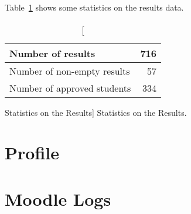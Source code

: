 Table~\ref{tab:results_stats} shows some statistics on the results data.

\begin{table}[h!]
    \centering

    \begin{tabular}{| l | r |}
        \hline
        Number of results           & 716 \\ \hline
        Number of non-empty results & 57  \\ \hline
        Number of approved students & 334 \\ \hline
    \end{tabular}

    \caption
        [Statistics on the Results]
        {Statistics on the Results.}

    \label{tab:results_stats}
\end{table}

\section{Profile}

\section{Moodle Logs}
